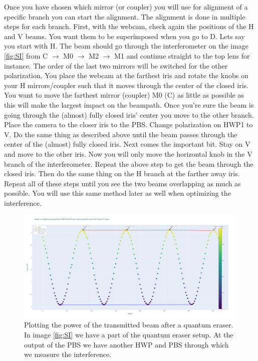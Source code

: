 Once you have chosen which mirror (or coupler) you will use for alignment of a specific branch you can start the alignment.
The alignment is done in multiple steps for each branch. First, with the webcam, check again the positions of the H and V beams. You want them to be superimposed when you go to D. 
Lets say you start with H. The beam should go through the interferometer on the image \ref{fig:SI} from C $\rightarrow$ M0 $\rightarrow$ M2 $\rightarrow$ M1 and 
continue straight to the top lens for instance. The order of the last two mirrors will be switched for the other polarization. 
You place the webcam at the farthest iris and rotate the knobs on your H mirrors/coupler such that it moves through the center of the closed iris.
You want to move the farthest mirror (coupler) M0 (C) as little as possible as this will make the largest impact on the beampath.
Once you're sure the beam is going through the (almost) fully closed iris' center you move to the other branch.
Place the camera to the closer iris to the PBS. Change polarization on HWP1 to V. Do the same thing as described above until the beam passes through the center of the (almost) fully closed iris.
Next comes the important bit. Stay on V and move to the other iris. Now you will only move the horizontal knob in the V branch of the interferometer.
Repeat the above step to get the beam through the closed iris. Then do the same thing on the H branch at the farther away iris.
Repeat all of these steps until you see the two beams overlapping as much as possible. You will use this same method later as well when
optimizing the interference.
\begin{figure}[H]
\begin{center}
	\includegraphics[width=12cm]{InterferencePlot.png}
\end{center}
\caption{Plotting the power of the transmitted beam after a quantum eraser. In image \ref{fig:SI} we have a part of the quantum eraser setup.
At the output of the PBS we have another HWP and PBS through which we measure the interference.}
\label{fig:InterferencePlot}
\end{figure}
